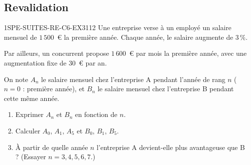 \subsection*{Revalidation}


\begin{exercice}{1SPE-SUITES-RE-C6-EX3}{1}{12}
Une entreprise verse à un employé un salaire mensuel de $1\,500$~€ la première année. Chaque année, le salaire augmente de $3\,\%$.

Par ailleurs, un concurrent propose $1\,600$~€ par mois la première année, avec une augmentation fixe de $30$~€ par an.

On note $A_n$ le salaire mensuel chez l'entreprise A pendant l'année de rang
$n$ ($n = 0$ : première année), et $B_n$ le salaire mensuel chez l'entreprise
B pendant cette même année.
\begin{enumerate}
  \item Exprimer $A_n$ et $B_n$ en fonction de $n$.
  \item Calculer $A_0$, $A_1$, $A_5$ et $B_0$, $B_1$, $B_5$.
  \item À partir de quelle année $n$ l'entreprise A devient-elle plus avantageuse que B ? (Essayer $n = 3, 4, 5, 6, 7$.)
\end{enumerate}
\end{exercice}


